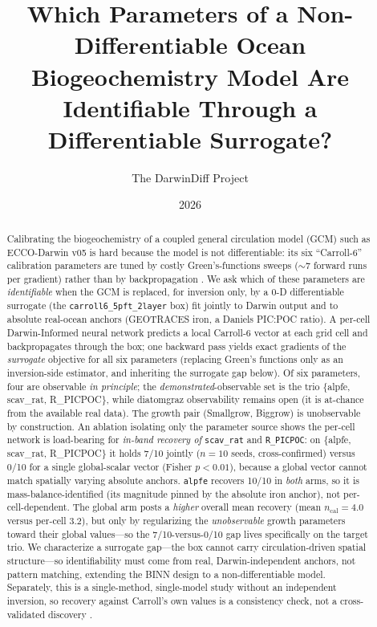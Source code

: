 \documentclass[11pt]{article}
\title{Which Parameters of a Non-Differentiable Ocean Biogeochemistry Model
Are Identifiable Through a Differentiable Surrogate?}
\author{The DarwinDiff Project}
\date{2026}
\begin{document}
\maketitle

\begin{abstract}
Calibrating the biogeochemistry of a coupled general circulation model (GCM) such
as ECCO-Darwin v05 is hard because the model is not differentiable: its six
``Carroll-6'' calibration parameters are tuned by costly Green's-functions sweeps
(\(\sim\!7\) forward runs per gradient) rather than by backpropagation
\cite{menemenlis2005,carroll2022}. We ask which of these parameters are
\emph{identifiable} when the GCM is replaced, for inversion only, by a 0-D
differentiable surrogate (the \texttt{carroll6\_5pft\_2layer} box) fit jointly to
Darwin output and to absolute real-ocean anchors (GEOTRACES iron, a Daniels
PIC:POC ratio). A per-cell Darwin-Informed neural network predicts a local
Carroll-6 vector at each grid cell and backpropagates through the box; one
backward pass yields exact gradients of the \emph{surrogate} objective for all six
parameters (replacing Green's functions only as an inversion-side estimator, and
inheriting the surrogate gap below). Of six parameters, four are observable
\emph{in principle}; the \emph{demonstrated}-observable set is the trio
\(\{\)alpfe, scav\_rat, R\_PICPOC\(\}\), while diatomgraz observability remains
open (it is at-chance from the available real data). The growth pair (Smallgrow,
Biggrow) is unobservable by construction. An ablation isolating only the parameter
source shows the per-cell network is load-bearing for \emph{in-band recovery of}
\texttt{scav\_rat} and \texttt{R\_PICPOC}: on \(\{\)alpfe, scav\_rat, R\_PICPOC\(\}\)
it holds 7/10 jointly (\(n{=}10\) seeds, cross-confirmed) versus 0/10 for a single
global-scalar vector (Fisher \(p{<}0.01\)), because a global vector cannot match
spatially varying absolute anchors. \texttt{alpfe} recovers 10/10 in \emph{both}
arms, so it is mass-balance-identified (its magnitude pinned by the absolute iron
anchor), not per-cell-dependent. The global arm posts a \emph{higher} overall mean
recovery (mean \(n_{\mathrm{cal}}=4.0\) versus per-cell \(3.2\)), but only by
regularizing the \emph{unobservable} growth parameters toward their global
values---so the 7/10-versus-0/10 gap lives specifically on the target trio. We
characterize a surrogate gap---the box cannot carry circulation-driven spatial
structure---so identifiability must come from real, Darwin-independent anchors, not
pattern matching, extending the BINN design \cite{xu2025binn} to a
non-differentiable model. Separately, this is a single-method, single-model study
without an independent inversion, so recovery against Carroll's own values is a
consistency check, not a cross-validated discovery
\cite{heimbach2015,transtrum2012}.
\end{abstract}
\end{document}
